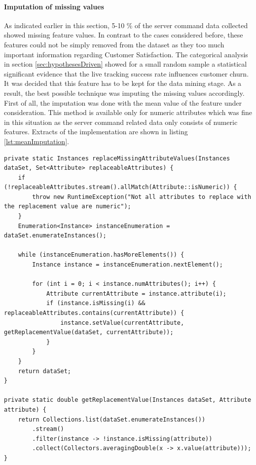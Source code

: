 \paragraph{Imputation of missing values}
As indicated earlier in this section, 5-10 \% of the server command data collected showed missing feature values. In contrast to the cases considered before, these features could not be simply removed from the dataset as they too much important information regarding Customer Satisfaction. The categorical analysis in section \ref{sec:hypothesesDriven} showed for a small random sample a statistical significant evidence that the live tracking success rate influences customer churn. It was decided that this feature has to be kept for the data mining stage. As a result, the best possible technique was imputing the missing values accordingly. First of all, the imputation was done with the mean value of the feature under consideration. This method is available only for numeric attributes which was fine in this situation as the server command related data only consists of numeric features. Extracts of the implementation are shown in listing \ref{lst:meanImputation}.

\begin{lstlisting}[caption={Mean and mode imputation of missing values}, label={lst:meanImputation}]
private static Instances replaceMissingAttributeValues(Instances dataSet, Set<Attribute> replaceableAttributes) {
	if (!replaceableAttributes.stream().allMatch(Attribute::isNumeric)) {
		throw new RuntimeException("Not all attributes to replace with the replacement value are numeric");
	}
	Enumeration<Instance> instanceEnumeration = dataSet.enumerateInstances();
	
	while (instanceEnumeration.hasMoreElements()) {
		Instance instance = instanceEnumeration.nextElement();
		
		for (int i = 0; i < instance.numAttributes(); i++) {
			Attribute currentAttribute = instance.attribute(i);
			if (instance.isMissing(i) && replaceableAttributes.contains(currentAttribute)) {
				instance.setValue(currentAttribute, getReplacementValue(dataSet, currentAttribute));
			}
		}
	}
	return dataSet;
}

private static double getReplacementValue(Instances dataSet, Attribute attribute) {
	return Collections.list(dataSet.enumerateInstances())
		.stream()
		.filter(instance -> !instance.isMissing(attribute))
		.collect(Collectors.averagingDouble(x -> x.value(attribute)));
}
\end{lstlisting}

